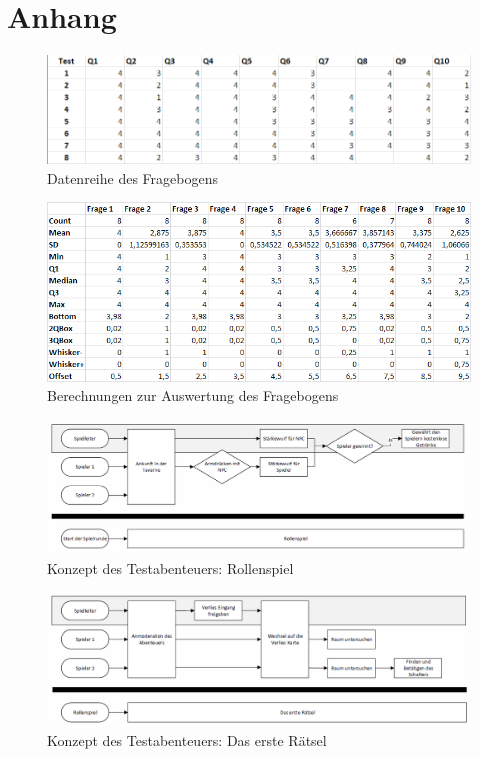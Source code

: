 \chapter{Anhang}
\label{appedixa}
\begin{figure}[h]
	\centering
		\includegraphics[width=1.00\textwidth]{media/tableData.png}
	\caption{Datenreihe des Fragebogens}
	\label{fig:tableData}
\end{figure}

\begin{figure}[h]
	\centering
		\includegraphics[width=1.00\textwidth]{media/excel_calculation.png}
	\caption{Berechnungen zur Auswertung des Fragebogens}
	\label{fig:excel_calculation}
\end{figure}

\begin{figure}[h]
	\centering
		\includegraphics[width=1.00\textwidth]{media/storyflow_01.png}
	\caption{Konzept des Testabenteuers: Rollenspiel}
	\label{fig:storyflow_01}
\end{figure}

\begin{figure}[h]
	\centering
		\includegraphics[width=1.00\textwidth]{media/storyflow_02.png}
	\caption{Konzept des Testabenteuers: Das erste Rätsel}
	\label{fig:storyflow_02}
\end{figure}


